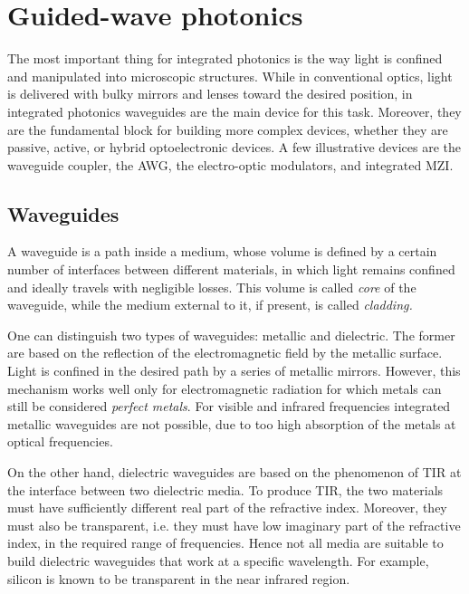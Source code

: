 \clearpage
\section{Guided-wave photonics}
\label{sec:guided-wave_photonics}
The most important thing for integrated photonics is the way light is confined and manipulated into microscopic structures.
While in conventional optics, light is delivered with bulky mirrors and lenses toward the desired position, in integrated photonics waveguides are the main device for this task.
Moreover, they are the fundamental block for building more complex devices, whether they are passive, active, or hybrid optoelectronic devices.
A few illustrative devices are the waveguide coupler, the \ac{AWG}, the electro-optic modulators, and integrated \ac{MZI}.


\subsection{Waveguides}
\label{ssec:waveguides}
A waveguide is a path inside a medium, whose volume is defined by a certain number of interfaces between different materials, in which light remains confined and ideally travels with negligible losses.
This volume is called \textit{core} of the waveguide, while the medium external to it, if present, is called \textit{cladding.}

One can distinguish two types of waveguides: metallic and dielectric.
The former are based on the reflection of the electromagnetic field by the metallic surface.
Light is confined in the desired path by a series of metallic mirrors.
However, this mechanism works well only for electromagnetic radiation for which metals can still be considered \textit{perfect metals}.
For visible and infrared frequencies integrated metallic waveguides are not possible, due to too high absorption of the metals at optical frequencies.

On the other hand, dielectric waveguides are based on the phenomenon of \ac{TIR} at the interface between two dielectric media.
To produce \acs{TIR}, the two materials must have sufficiently different real part of the refractive index.
Moreover, they must also be transparent, i.e. they must have low imaginary part of the refractive index, in the required range of frequencies.
Hence not all media are suitable to build dielectric waveguides that work at a specific wavelength.
For example, silicon is known to be transparent in the near infrared region.

